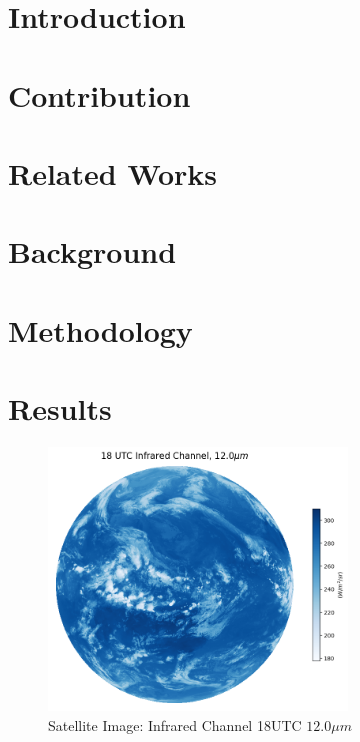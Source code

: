 \documentclass[acmtog, authorversion]{acmart}
\begin{document}
\maketitle

\section{Introduction} \label{introduction}



\section{Contribution}


\section{Related Works}


\section{Background}


\section{Methodology}


\section{Results}



\begin{figure}
    \centering
    \includegraphics[width=225pt]{./images/infrared.png}
    \caption{Satellite Image: Infrared Channel 18UTC $12.0\mu m$}
    \label{fig:infra}
\end{figure}
\end{document}
